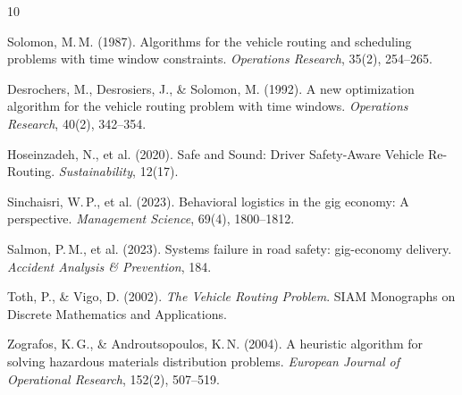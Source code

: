 \documentclass[10pt,twocolumn,letterpaper]{article}
\begin{document}
\begin{thebibliography}{10}

 Solomon, M.\,M. (1987). Algorithms for the vehicle routing and scheduling problems with time window constraints. \textit{Operations Research}, 35(2), 254--265.

 Desrochers, M., Desrosiers, J., \& Solomon, M. (1992). A new optimization algorithm for the vehicle routing problem with time windows. \textit{Operations Research}, 40(2), 342--354.

 Hoseinzadeh, N., et al. (2020). Safe and Sound: Driver Safety-Aware Vehicle Re-Routing. \textit{Sustainability}, 12(17).

 Sinchaisri, W.\,P., et al. (2023). Behavioral logistics in the gig economy: A perspective. \textit{Management Science}, 69(4), 1800--1812.

 Salmon, P.\,M., et al. (2023). Systems failure in road safety: gig-economy delivery. \textit{Accident Analysis \& Prevention}, 184.

 Toth, P., \& Vigo, D. (2002). \textit{The Vehicle Routing Problem}. SIAM Monographs on Discrete Mathematics and Applications.

 Zografos, K.\,G., \& Androutsopoulos, K.\,N. (2004). A heuristic algorithm for solving hazardous materials distribution problems. \textit{European Journal of Operational Research}, 152(2), 507--519.

\end{thebibliography}
\end{document}
